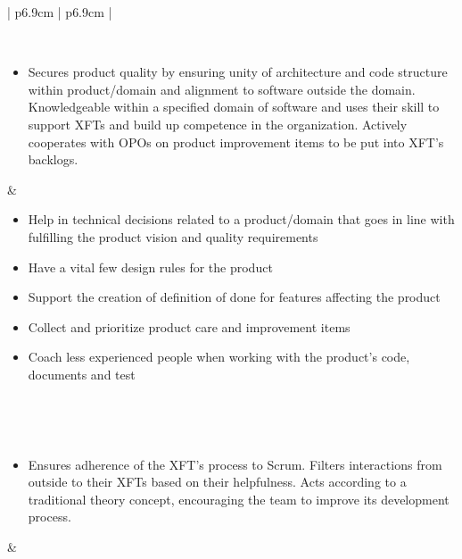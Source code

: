 \begin{table}[h]
\begin{tabularx}{\textwidth}{ | p{6.9cm} | p{6.9cm} | }
   \\ \hline

   
   \end{tabularx}
\end{table}

\begin{table}[h]
   \begin{tabularx}{\textwidth}{ | p{6.9cm} | p{6.9cm} | }
   
   \hline
   
   
   \\ \hline
   
   \begin{itemize}[label={}, leftmargin=*, topsep=0pt, itemsep=0pt, partopsep=0pt]
     \item Secures product quality by ensuring unity of architecture and code structure within product/domain and alignment to software outside the domain. Knowledgeable within a specified domain of software and uses their skill to support XFTs and build up competence in the organization. Actively cooperates with OPOs on product improvement items to be put into XFT's backlogs.
   \end{itemize} & 
   
   \begin{itemize}[label={}, leftmargin=*, topsep=0pt, itemsep=0pt, partopsep=0pt]
     \item Help in technical decisions related to a product/domain that goes in line with fulfilling the product vision and quality requirements
     \item Have a vital few design rules for the product
     \item Support the creation of definition of done for features affecting the product
     \item Collect and prioritize product care and improvement items
     \item Coach less experienced people when working with the product's code, documents and test 
   \end{itemize} 
   
   \\ \hline

   
   \\ \hline 
   
   \begin{itemize}[label={}, leftmargin=*, topsep=0pt, itemsep=0pt, partopsep=0pt]
     \item Ensures adherence of the XFT's process to Scrum. Filters interactions from outside to their XFTs based on their helpfulness. Acts according to a traditional theory concept, encouraging the team to improve its development process.
   \end{itemize} & 
   

\end{tabularx}
\end{table}
